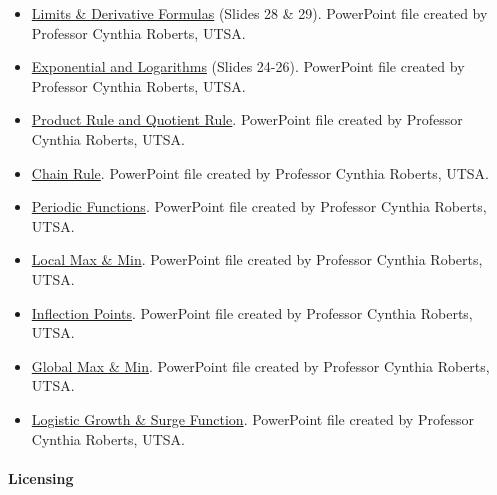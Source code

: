 \begin{itemize}
    \item \href{https://mathresearch.utsa.edu/wikiFiles/MAT1193/Derivative\%20Formulas/Presentation3b,4,5_Limits\%20\&\%20Derivative\%20Formulas.pptx}{Limits \& Derivative Formulas} (Slides 28 \& 29). PowerPoint file created by Professor Cynthia Roberts, UTSA.
    \item \href{https://mathresearch.utsa.edu/wikiFiles/MAT1193/Derivative\%20Formulas/Presentation5b_Exponential\%20and\%20Logs.pptx}{Exponential and Logarithms} (Slides 24-26). PowerPoint file created by Professor Cynthia Roberts, UTSA.
    \item \href{https://mathresearch.utsa.edu/wikiFiles/MAT1193/Applications/Presentation6\%20Product\%20Rule\%20and\%20Quotient\%20Rule.pptx}{Product Rule and Quotient Rule}. PowerPoint file created by Professor Cynthia Roberts, UTSA.
    \item \href{https://mathresearch.utsa.edu/wikiFiles/MAT1193/Applications/Presentation6b\%20Chain\%20Rule.pptx}{Chain Rule}. PowerPoint file created by Professor Cynthia Roberts, UTSA.
    \item \href{https://mathresearch.utsa.edu/wikiFiles/MAT1193/Applications/Presentation7_periodic\%20functions.pptx}{Periodic Functions}. PowerPoint file created by Professor Cynthia Roberts, UTSA.
    \item \href{https://mathresearch.utsa.edu/wikiFiles/MAT1193/Applications/Presentation8\%20Local\%20Max\%20\&\%20Min.pptx}{Local Max \& Min}. PowerPoint file created by Professor Cynthia Roberts, UTSA.
    \item \href{https://mathresearch.utsa.edu/wikiFiles/MAT1193/Applications/Presentation8b_Inflection\%20Points.pptx}{Inflection Points}. PowerPoint file created by Professor Cynthia Roberts, UTSA.
    \item \href{https://mathresearch.utsa.edu/wikiFiles/MAT1193/Applications/Presentation9_Global\%20Max\%20\&\%20Min.pptx}{Global Max \& Min}. PowerPoint file created by Professor Cynthia Roberts, UTSA.
    \item \href{https://mathresearch.utsa.edu/wikiFiles/MAT1193/Applications/Presentation10_LogisticGrowth\&SurgeFunction.pptx}{Logistic Growth \& Surge Function}. PowerPoint file created by Professor Cynthia Roberts, UTSA.
\end{itemize}

\paragraph{Licensing}



